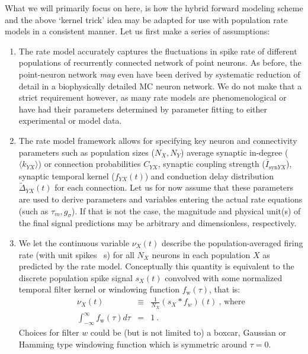 What we will primarily focus on here,
is how the hybrid forward modeling scheme and the above `kernel trick' idea may be adapted for use with population rate models in a consistent manner.
Let us first make a series of assumptions:
\begin{enumerate}
\item The rate model accurately captures the fluctuations in spike rate of different populations of recurrently connected network of point neurons.
As before, the point-neuron network \textit{may} even have been derived by systematic reduction of detail in a biophysically detailed MC neuron network.
We do not make that a strict requirement however,
as many rate models are phenomenological or have had their parameters determined by parameter fitting to either experimental or model data.

\item The rate model framework allows for specifying key neuron and connectivity parameters such as
population sizes ($N_X, N_Y$) average synaptic in-degree ($\langle k_{YX} \rangle$) or connection probabilities $C_{YX}$,
synaptic coupling strength ($\overline{I}_{\text{syn}YX}$),
synaptic temporal kernel ($f_{YX}(t)$) and
conduction delay distribution $\widetilde{\Delta}_{YX}(t)$ for each connection.
Let us for now assume that these parameters are used to derive parameters and variables entering the actual rate equations (such as $\tau_m, g_\sigma$).
If that is not the case, the magnitude and physical unit(s) of the final signal predictions may be arbitrary and dimensionless, respectively.

\item We let the continuous variable $\nu_X(t)$ describe the population-averaged firing rate (with unit spikes \si{\per\second}) for all $N_X$ neurons in each population $X$ as predicted by the rate model.
Conceptually this quantity is equivalent to the discrete population spike signal $s_X(t)$ convolved with some normalized temporal filter kernel or windowing function $f_\text{w}(\tau)$, that is:
\begin{eqnarray}
\nu_X(t) &\equiv& \frac{1}{N_X} \left(s_X \ast f_w \right)(t)~\text{, where} \\
\int_{-\infty}^\infty f_\text{w}(\tau) d\tau &=& 1 ~.
\end{eqnarray}
Choices for filter $w$ could be (but is not limited to) a boxcar, Gaussian or Hamming type windowing function which is symmetric around $\tau = 0$.

\end{enumerate}

